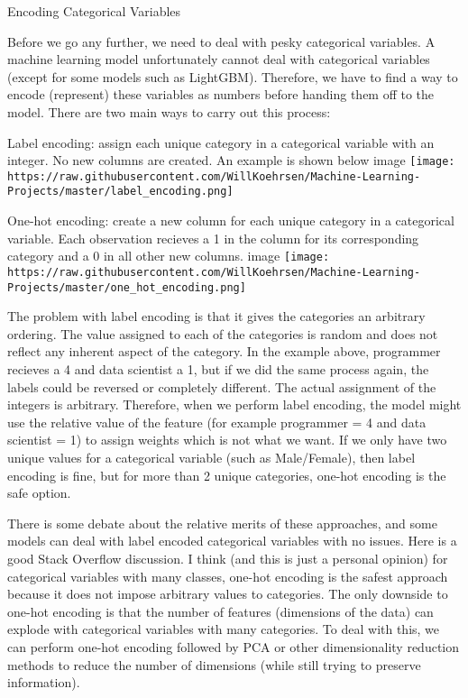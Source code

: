 \documentclass[11pt]{article}
\makeatletter
\def\maxwidth{\ifdim\Gin@nat@width>\linewidth\linewidth
    \else\Gin@nat@width\fi}
\let\Oldincludegraphics\includegraphics
\renewcommand{\includegraphics}[1]{\Oldincludegraphics[width=.8\maxwidth]{#1}}
\makeatother
\begin{document}
    Encoding Categorical Variables

    Before we go any further, we need to deal with pesky categorical
variables. A machine learning model unfortunately cannot deal with
categorical variables (except for some models such as LightGBM).
Therefore, we have to find a way to encode (represent) these variables
as numbers before handing them off to the model. There are two main ways
to carry out this process:

Label encoding: assign each unique category in a categorical variable
with an integer. No new columns are created. An example is shown below
image
\texttt{[image: https://raw.githubusercontent.com/WillKoehrsen/Machine-Learning-Projects/master/label\_encoding.png]}

One-hot encoding: create a new column for each unique category in a
categorical variable. Each observation recieves a 1 in the column for
its corresponding category and a 0 in all other new columns. image
\texttt{[image: https://raw.githubusercontent.com/WillKoehrsen/Machine-Learning-Projects/master/one\_hot\_encoding.png]}

The problem with label encoding is that it gives the categories an
arbitrary ordering. The value assigned to each of the categories is
random and does not reflect any inherent aspect of the category. In the
example above, programmer recieves a 4 and data scientist a 1, but if we
did the same process again, the labels could be reversed or completely
different. The actual assignment of the integers is arbitrary.
Therefore, when we perform label encoding, the model might use the
relative value of the feature (for example programmer = 4 and data
scientist = 1) to assign weights which is not what we want. If we only
have two unique values for a categorical variable (such as Male/Female),
then label encoding is fine, but for more than 2 unique categories,
one-hot encoding is the safe option.

There is some debate about the relative merits of these approaches, and
some models can deal with label encoded categorical variables with no
issues. Here is a good Stack Overflow discussion. I think (and this is
just a personal opinion) for categorical variables with many classes,
one-hot encoding is the safest approach because it does not impose
arbitrary values to categories. The only downside to one-hot encoding is
that the number of features (dimensions of the data) can explode with
categorical variables with many categories. To deal with this, we can
perform one-hot encoding followed by PCA or other dimensionality
reduction methods to reduce the number of dimensions (while still trying
to preserve information).
\end{document}
